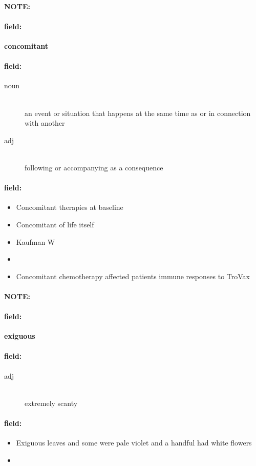 \documentclass[12pt]{article}
\newenvironment{note}{\paragraph{NOTE:}}{}
\newenvironment{field}{\paragraph{field:}}{}
\begin{document}
\begin{note}
\begin{field}
\textbf{\large concomitant}
\end{field}


\begin{field}
\begin{description}
\item[noun] \hfill \\ 
an event or situation that happens at the same time as or in connection with another

\item[adj] \hfill \\ 
following or accompanying as a consequence

\end{description}
\end{field}

\begin{field}
\begin{itemize}
\item Concomitant therapies at baseline
\item Concomitant of life itself
\item Kaufman W
\item 
\item Concomitant chemotherapy affected patients immune responses to TroVax
\end{itemize}
\end{field}
\end{note}
\begin{note}
\begin{field}
\textbf{\large exiguous}
\end{field}


\begin{field}
\begin{description}
\item[adj] \hfill \\ 
extremely scanty

\end{description}
\end{field}

\begin{field}
\begin{itemize}
\item Exiguous leaves and some were pale violet and a handful had white flowers
\item 
\end{itemize}
\end{field}
\end{note}
\end{document}
